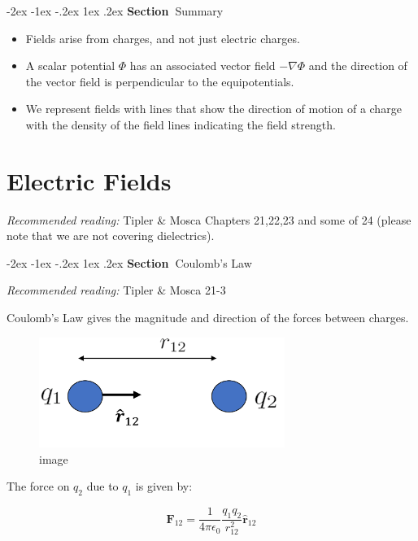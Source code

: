 \documentclass[
]{book}
\makeatletter
\renewcommand\section{%
\@startsection{section}{1}{\z@}%
              {-2ex \@plus -1ex \@minus -.2ex}%
              {1ex \@plus .2ex}%
              {\sffamily\bfseries\large\noindent Section~}}
\numberwithin{equation}{section}
\makeatother
\begin{document}
\hypertarget{summary}{%
\section{Summary}\label{summary}}

\begin{itemize}
\item
  Fields arise from charges, and not just electric charges.
\item
  A scalar potential \(\Phi\) has an associated vector field
  \(-\nabla \Phi\) and the direction of the vector field is
  perpendicular to the equipotentials.
\item
  We represent fields with lines that show the direction of motion of
  a charge with the density of the field lines indicating the field
  strength.
\end{itemize}

\hypertarget{electric-fields}{%
\chapter{Electric Fields}\label{electric-fields}}

\emph{Recommended reading:} Tipler \& Mosca Chapters 21,22,23 and some of 24
(please note that we are not covering dielectrics).

\hypertarget{coulombs-law}{%
\section{Coulomb's Law}\label{coulombs-law}}

\emph{Recommended reading:} Tipler \& Mosca 21-3

Coulomb's Law gives the magnitude and direction of the forces between
charges.

\begin{figure}
\centering
\includegraphics[width=80mm,height=\textheight]{Figures/coulomb1.png}
\caption{image}
\end{figure}

The force on \(q_2\) due to \(q_1\) is given by:

\begin{equation}
\label{eq:coulombs}
\mathbf{F}_{12}= \frac{1}{4\pi \epsilon_0} \frac{q_1 q_2}{r_{12}^2} \hat{\mathbf{r}}_{12}
\end{equation}
\end{document}
